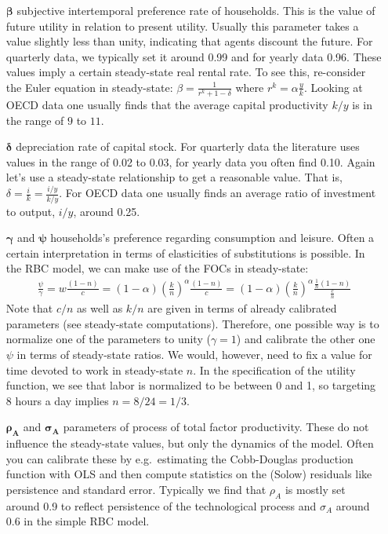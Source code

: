 \begin{enumerate}
\begin{itemize}
\item[\(\boldsymbol{\beta}\)] subjective intertemporal preference rate of households.
This is the value of future utility in relation to present utility.
Usually this parameter takes a value slightly less than unity, indicating that agents discount the future.
For quarterly data, we typically set it around 0.99 and for yearly data 0.96.
These values imply a certain steady-state real rental rate.
To see this, re-consider the Euler equation in steady-state:
\(\beta = \frac{1}{r^{k}+1-\delta}\) where \(r^{k} = \alpha \frac{y}{k}\).
Looking at OECD data one usually finds that the average capital productivity \(k/y\) is in the range of \(9\) to \(11\).

\item[\(\boldsymbol{\delta}\)] depreciation rate of capital stock.
For quarterly data the literature uses values in the range of 0.02 to 0.03, for yearly data you often find 0.10.
Again let's use a steady-state relationship to get a reasonable value.
That is, \(\delta=\frac{i}{k}=\frac{i/y}{k/y}\).
For OECD data one usually finds an average ratio of investment to output, \(i/y\), around 0.25.

\item[\(\boldsymbol{\gamma}\) and \(\boldsymbol{\psi}\)] households's preference regarding consumption and leisure.
Often a certain interpretation in terms of elasticities of substitutions is possible.
In the RBC model, we can make use of the FOCs in steady-state:
\begin{align*}
\frac{\psi}{\gamma} = w\frac{(1-n)}{c}= (1-\alpha){\left(\frac{k}{n}\right)}^\alpha\frac{(1-n)}{c}
= (1-\alpha){\left(\frac{k}{n}\right)}^\alpha\frac{\frac{1}{n}(1-n)}{\frac{c}{n}}
\end{align*}
Note that \(c/n\) as well as \(k/n\) are given in terms of already calibrated parameters (see steady-state computations).
Therefore, one possible way is to normalize one of the parameters to unity (\(\gamma=1\))
  and calibrate the other one \(\psi \) in terms of steady-state ratios.
We would, however, need to fix a value for time devoted to work in steady-state \(n\).
In the specification of the utility function, we see that labor is normalized to be between 0 and 1,
  so targeting 8 hours a day implies \(n=8/24=1/3\).

\item[\(\boldsymbol{\rho_A}\) and \(\boldsymbol{\sigma_A}\)] parameters of process of total factor productivity.
These do not influence the steady-state values, but only the dynamics of the model.
Often you can calibrate these by e.g.\ estimating the Cobb-Douglas production function with OLS
  and then compute statistics on the (Solow) residuals like persistence and standard error.
Typically we find that \(\rho_A\) is mostly set around 0.9 to reflect persistence of the technological process
  and \(\sigma_A\) around \(0.6\) in the simple RBC model.
\end{itemize}


\end{enumerate}
